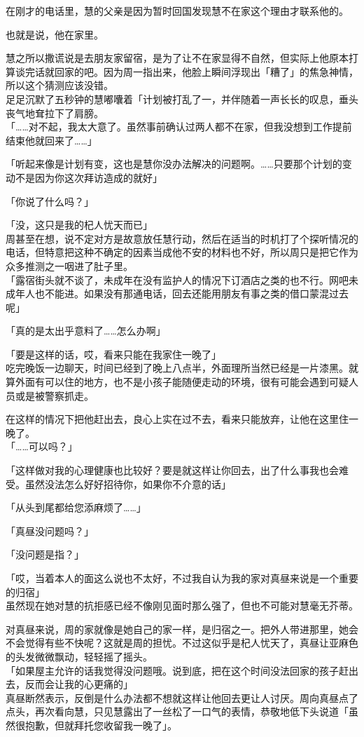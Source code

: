 在刚才的电话里，慧的父亲是因为暂时回国发现慧不在家这个理由才联系他的。

也就是说，他在家里。

慧之所以撒谎说是去朋友家留宿，是为了让不在家显得不自然，但实际上他原本打算谈完话就回家的吧。因为周一指出来，他脸上瞬间浮现出「糟了」的焦急神情，所以这个猜测应该没错。\\

足足沉默了五秒钟的慧嘟囔着「计划被打乱了一，并伴随着一声长长的叹息，垂头丧气地耷拉下了肩膀。\\

「……对不起，我太大意了。虽然事前确认过两人都不在家，但我没想到工作提前结束他就回来了……」

「听起来像是计划有变，这也是慧你没办法解决的问题啊。……只要那个计划的变动不是因为你这次拜访造成的就好」

「你说了什么吗？」

「没，这只是我的杞人忧天而已」\\

周甚至在想，说不定对方是故意放任慧行动，然后在适当的时机打了个探听情况的电话，但特意把这种不确定的因素当成他不安的材料也不好，所以周只是把它作为众多推测之一咽进了肚子里。\\

「露宿街头就不谈了，未成年在没有监护人的情况下订酒店之类的也不行。网吧未成年人也不能进。如果没有那通电话，回去还能用朋友有事之类的借口蒙混过去呢」

「真的是太出乎意料了……怎么办啊」

「要是这样的话，哎，看来只能在我家住一晚了」\\

吃完晚饭一边聊天，时间已经到了晚上八点半，外面理所当然已经是一片漆黑。就算外面有可以住的地方，也不是小孩子能随便走动的环境，很有可能会遇到可疑人员或是被警察抓走。

在这样的情况下把他赶出去，良心上实在过不去，看来只能放弃，让他在这里住一晚了。\\

「……可以吗？」

「这样做对我的心理健康也比较好？要是就这样让你回去，出了什么事我也会难受。虽然没法怎么好好招待你，如果你不介意的话」

「从头到尾都给您添麻烦了……」

「真昼没问题吗？」

「没问题是指？」

「哎，当着本人的面这么说也不太好，不过我自认为我的家对真昼来说是一个重要的归宿」\\

虽然现在她对慧的抗拒感已经不像刚见面时那么强了，但也不可能对慧毫无芥蒂。

对真昼来说，周的家就像是她自己的家一样，是归宿之一。把外人带进那里，她会不会觉得有些不快呢？这就是周的担忧。不过这似乎是杞人忧天了，真昼让亚麻色的头发微微飘动，轻轻摇了摇头。\\

「如果屋主允许的话我觉得没问题哦。说到底，把在这个时间没法回家的孩子赶出去，反而会让我的心更痛的」\\

真昼断然表示，反倒是什么办法都不想就这样让他回去更让人讨厌。周向真昼点了点头，再次看向慧，只见慧露出了一丝松了一口气的表情，恭敬地低下头说道「虽然很抱歉，但就拜托您收留我一晚了」。
